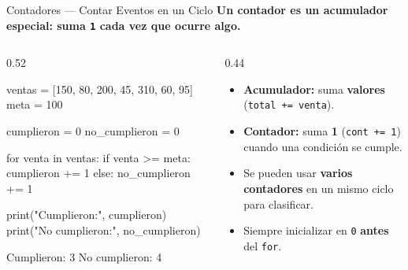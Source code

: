 \documentclass[aspectratio=169, 11pt]{beamer}
\begin{document}
\begin{frame}[fragile,shrink=30]{Contadores --- Contar Eventos en un Ciclo}
  \vspace{-6pt}
  {\small\color{arcaDark}\bfseries
    Un \textbf{contador} es un acumulador especial: suma \texttt{1}
    cada vez que ocurre algo.}

  \vspace{4pt}
  \begin{columns}[T]
    \begin{column}{0.52\textwidth}
      \begin{pyblock}
ventas = [150, 80, 200, 45, 310, 60, 95]
meta = 100

cumplieron = 0
no_cumplieron = 0

for venta in ventas:
    if venta >= meta:
        cumplieron += 1
    else:
        no_cumplieron += 1

print("Cumplieron:", cumplieron)
print("No cumplieron:", no_cumplieron)
      \end{pyblock}
      \vspace{-2pt}
      \begin{outputblock}
Cumplieron: 3
No cumplieron: 4
      \end{outputblock}
    \end{column}

    \begin{column}{0.44\textwidth}
      \vspace{2pt}
      {\footnotesize\color{textMuted}
      \begin{itemize}\setlength{\itemsep}{5pt}
        \item[{\color{arcaRed}\scriptsize\faArrowRight}]
          \textbf{Acumulador:} suma \textbf{valores}
          (\texttt{total += venta}).

        \item[{\color{arcaRed}\scriptsize\faArrowRight}]
          \textbf{Contador:} suma \textbf{1}
          (\texttt{cont += 1}) cuando una
          condición se cumple.

        \item[{\color{arcaRed}\scriptsize\faArrowRight}]
          Se pueden usar \textbf{varios contadores}
          en un mismo ciclo para clasificar.

        \item[{\color{arcaRed}\scriptsize\faLightbulb}]
          Siempre inicializar en \texttt{0}
          \textbf{antes} del \texttt{for}.
      \end{itemize}
      }
    \end{column}
  \end{columns}
\end{frame}
\end{document}
